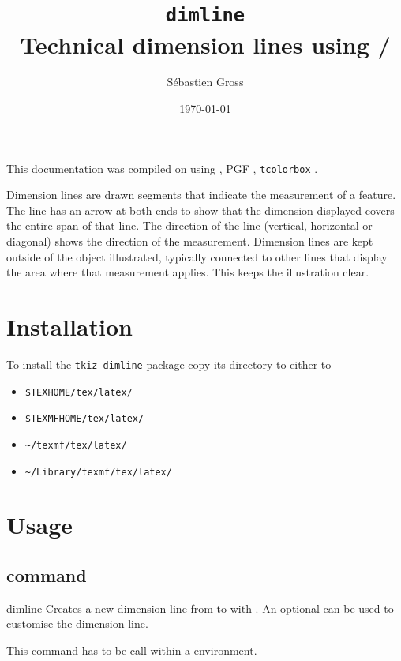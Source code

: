 \documentclass[a4paper]{article}
\title{\texttt{dimline}\\ Technical dimension lines using \PGF/\TikZ}
\author{Sébastien Gross}
\date{\today}
\makeatletter
\newcommand{\compilator}{\XeLaTeX{}}
\newcommand{\cversion}{\the\XeTeXversion\XeTeXrevision}
\newcommand{\compilator}{\LaTeX{}}
\newcommand{\cversion}{
\ifnum\pdftexversion<100 %
          \the\pdftexversion.\pdftexrevision
        \else
          \ifnum\pdftexversion<130 %
            \expandafter\@car\the\pdftexversion\@empty\@nil.%
            \expandafter\@cdr\the\pdftexversion\@empty\@nil  
            \pdftexrevision
          \else
            \expandafter\@car\the\pdftexversion\@empty\@nil.%
            \expandafter\@cdr\the\pdftexversion\@empty\@nil.%
            \pdftexrevision
          \fi
        \fi
}
\newcommand{\PGF}{\textsc{PGF}}
\makeatother
\begin{document}
\maketitle

\begin{tcolorbox}[title={Contents},fonttitle=\bfseries\Large,
  colback=yellow!10!white,colframe=red!50!black,before=\par\bigskip\noindent]
\makeatletter
{}
\makeatother
\end{tcolorbox}

\makeatletter
This documentation was compiled on {\platformname} using {\compilator}
{\cversion}, {\PGF} {\pgfversion}, \texttt{tcolorbox} \tcb@version.
\makeatother


Dimension lines are drawn segments that indicate the measurement of a
feature. The line has an arrow at both ends to show that the dimension
displayed covers the entire span of that line. The direction of the line
(vertical, horizontal or diagonal) shows the direction of the
measurement. Dimension lines are kept outside of the object illustrated,
typically connected to other lines that display the area where that
measurement applies. This keeps the illustration clear.


\section{Installation}

To install the \verb"tkiz-dimline" package copy its directory to either to
\begin{itemize}
\item \verb"$TEXHOME/tex/latex/"
\item \verb"$TEXMFHOME/tex/latex/"
\item \verb"~/texmf/tex/latex/"
\item \verb"~/Library/texmf/tex/latex/"
\end{itemize}

\section{Usage}

\subsection{command}
\begin{docCommand}{dimline}{}
  Creates a new dimension line from  to  with
  . An optional  can be used to customise the
  dimension line.

  This command has to be call within a 
  environment.

\end{docCommand}
\end{document}
